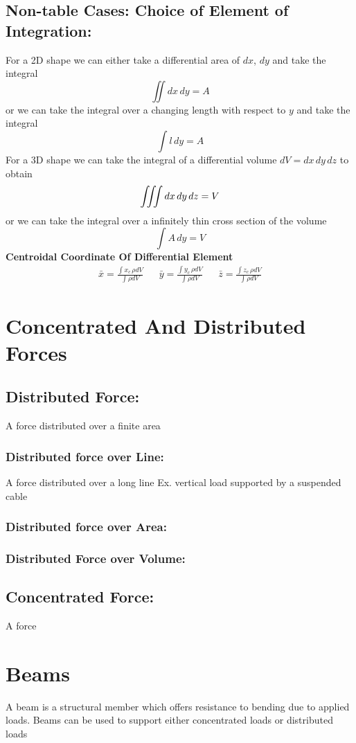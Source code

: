 \documentclass[14pt]{article}
\begin{document}
    \subsection{Non-table Cases: Choice of Element of Integration:}
    For a 2D shape we can either take a differential area of $dx$, $dy$ and take the integral
    $$\iint dx\, dy=A$$
    or we can take the integral over a changing length with respect to $y$ and take the integral
    $$\int l\, dy=A$$
    For a 3D shape we can take the integral of a differential volume $dV=dx\, dy\, dz$ to obtain
    $$\iiint\\ dx\, dy\, dz=V$$
    or we can take the integral over a infinitely thin cross section of the volume
    $$\int A\, dy=V$$
    \textbf{Centroidal Coordinate Of Differential Element}
    \begin{align*}
        \bar x=\frac{\int x_c\, \rho dV}{\int \rho dV}&& \bar y=\frac{\int y_c\, \rho dV}{\int \rho dV}&& \bar z=\frac{\int z_c\, \rho dV}{\int \rho dV}
    \end{align*}
    \section{Concentrated And Distributed Forces}
    \subsection{Distributed Force:}
    A force distributed over a finite area 
    \subsubsection{Distributed force over Line:}
    A force distributed over a long line Ex. vertical load supported by a suspended cable
    \subsubsection{Distributed force over Area:}
    \subsubsection{Distributed Force over Volume:}
    \subsection{Concentrated Force:}
    A force  
    \section{Beams}
    A beam is a structural member which offers resistance to bending due to applied loads.
    Beams can be used to support either concentrated loads or distributed loads 
\end{document}
